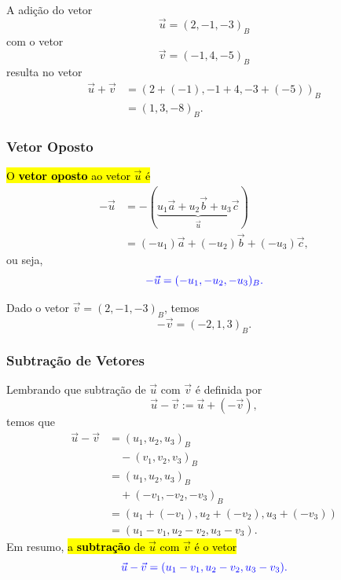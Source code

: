 \begin{ex}
  A adição do vetor 
  \begin{equation}
    \vec{u} = (2, -1, -3)_B
  \end{equation} 
  com o vetor 
  \begin{equation}
    \vec{v} = (-1, 4, -5)_B
  \end{equation} 
  resulta no vetor
  \begin{align}
    \vec{u}+\vec{v} &= \left(2+(-1), -1+4, -3+(-5)\right)_B\\
      &= (1,3,-8)_B.
  \end{align}
\end{ex}

\subsubsection{Vetor Oposto}

\hl{O \textbf{vetor oposto} ao vetor $\vec{u}$ é}
\begin{align}
  -\vec{u} &= -(\underbrace{u_1\vec{a} + u_2\vec{b} + u_3\vec{c}}_{\vec{u}})\\
           &= (-u_1)\vec{a} + (-u_2)\vec{b} + (-u_3)\vec{c},
\end{align}
ou seja,
\begin{equation}\color{blue}-\vec{u} = (-u_1, -u_2, -u_3)_B.
\end{equation}

\begin{ex}
  Dado o vetor $\vec{v} = (2, -1, -3)_B$, temos
  \begin{equation}
    -\vec{v} = \left(-2, 1, 3\right)_B.
  \end{equation}
\end{ex}

\subsubsection{Subtração de Vetores}

Lembrando que subtração de $\vec{u}$ com $\vec{v}$ é definida por
\begin{equation}
    \vec{u}-\vec{v} := \vec{u} + (-\vec{v}),
\end{equation}
temos que
\begin{align}
  \vec{u} - \vec{v} &= (u_1, u_2, u_3)_B\nonumber\\
                    &\quad- (v_1, v_2, v_3)_B\\
                    &= (u_1, u_2, u_3)_B\nonumber\\
                    &\quad+ (-v_1, -v_2, -v_3)_B\\
                    &= \left(u_1+(-v_1), u_2+(-v_2), u_3+(-v_3)\right)\\
                    &= (u_1-v_1, u_2-v_2, u_3-v_3).
\end{align}
Em resumo, \hl{a \textbf{subtração} de $\vec{u}$ com $\vec{v}$ é o vetor}
\begin{equation}\color{blue}\vec{u} - \vec{v} = (u_1-v_1, u_2-v_2, u_3-v_3).
\end{equation}


